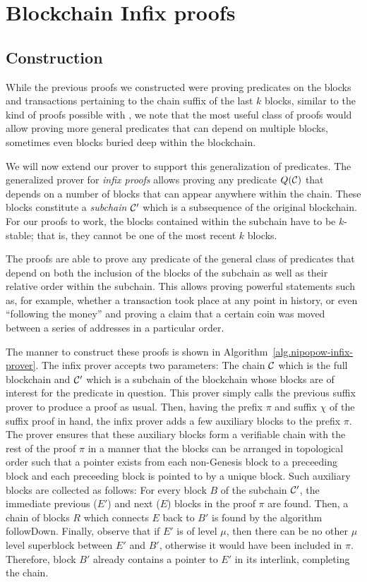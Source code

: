 \section{Blockchain Infix proofs}

\subsection{Construction}

While the previous proofs we constructed were proving predicates on the blocks
and transactions pertaining to the chain suffix of the last $k$ blocks, similar
to the kind of proofs possible with \cite{KLS}, we note that the most useful
class of proofs would allow proving more general predicates that can depend on
multiple blocks, sometimes even blocks buried deep within the blockchain.

We will now extend our prover to support this generalization of predicates. The
generalized prover for \textit{infix proofs} allows proving any predicate
$Q(\mathcal{C})$ that depends on a number of blocks that can appear anywhere within
the chain. These blocks constitute a \textit{subchain} $\mathcal{C}'$ which is a
subsequence of the original blockchain. For our proofs to work, the blocks
contained within the subchain have to be $k$-stable; that is, they cannot be
one of the most recent $k$ blocks.

The proofs are able to prove any predicate of the general class of predicates
that depend on both the inclusion of the blocks of the subchain as well as
their relative order within the subchain. This allows proving powerful
statements such as, for example, whether a transaction took place at any point
in history, or even ``following the money'' and proving a claim that a certain
coin was moved between a series of addresses in a particular order.

The manner to construct these proofs is shown in
Algorithm~\ref{alg.nipopow-infix-prover}. The infix prover accepts two
parameters: The chain $\mathcal{C}$ which is the full blockchain and $\mathcal{C}'$ which
is a subchain of the blockchain whose blocks are of interest for the predicate
in question. This prover simply calls the previous suffix prover to produce a
proof as usual. Then, having the prefix $\pi$ and suffix $\chi$ of the suffix
proof in hand, the infix prover adds a few auxiliary blocks to the prefix
$\pi$. The prover ensures that these auxiliary blocks form a verifiable chain
with the rest of the proof $\pi$ in a manner that the blocks can be arranged in
topological order such that a pointer exists from each non-Genesis block to a
preceeding block and each preceeding block is pointed to by a unique block.
Such auxiliary blocks are collected as follows: For every block $B$ of the
subchain $\mathcal{C}'$, the immediate previous ($E'$) and next ($E$) blocks in the
proof $\pi$ are found. Then, a chain of blocks $R$ which connects $E$ back to
$B'$ is found by the algorithm followDown. Finally, observe that if $E'$ is of
level $\mu$, then there can be no other $\mu$ level superblock between $E'$ and
$B'$, otherwise it would have been included in $\pi$. Therefore, block $B'$
already contains a pointer to $E'$ in its interlink, completing the chain.

